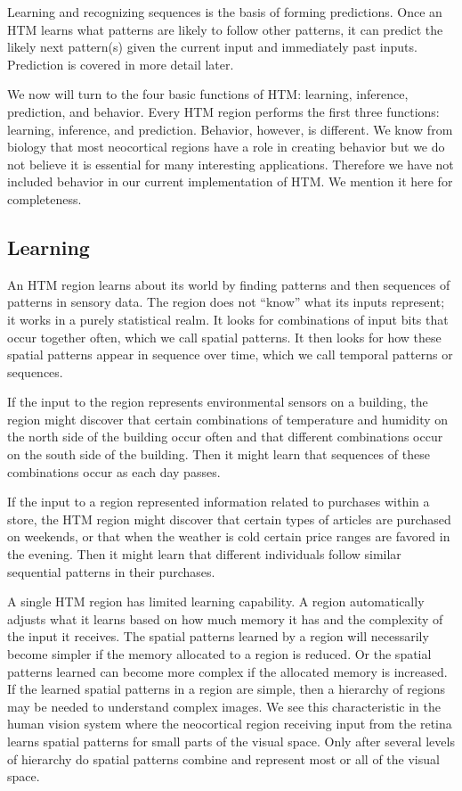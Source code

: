\documentclass{report}
\begin{document}
Learning and recognizing sequences is the basis of forming
predictions. Once an HTM learns what patterns are likely to follow
other patterns, it can predict the likely next pattern(s) given the
current input and immediately past inputs. Prediction is covered in
more detail later.

We now will turn to the four basic functions of HTM: learning,
inference, prediction, and behavior. Every HTM region performs the
first three functions: learning, inference, and prediction. Behavior,
however, is different. We know from biology that most neocortical
regions have a role in creating behavior but we do not believe it is
essential for many interesting applications. Therefore we have not
included behavior in our current implementation of HTM. We mention it
here for completeness.

\subsection*{Learning}

An HTM region learns about its world by finding patterns and then
sequences of patterns in sensory data. The region does not ``know''
what its inputs represent; it works in a purely statistical realm. It
looks for combinations of input bits that occur together often, which
we call spatial patterns. It then looks for how these spatial patterns
appear in sequence over time, which we call temporal patterns or
sequences.

If the input to the region represents environmental sensors on a
building, the region might discover that certain combinations of
temperature and humidity on the north side of the building occur often
and that different combinations occur on the south side of the
building. Then it might learn that sequences of these combinations
occur as each day passes.

If the input to a region represented information related to purchases
within a store, the HTM region might discover that certain types of
articles are purchased on weekends, or that when the weather is cold
certain price ranges are favored in the evening. Then it might learn
that different individuals follow similar sequential patterns in their
purchases.

A single HTM region has limited learning capability. A region
automatically adjusts what it learns based on how much memory it has
and the complexity of the input it receives. The spatial patterns
learned by a region will necessarily become simpler if the memory
allocated to a region is reduced. Or the spatial patterns learned can
become more complex if the allocated memory is increased. If the
learned spatial patterns in a region are simple, then a hierarchy of
regions may be needed to understand complex images. We see this
characteristic in the human vision system where the neocortical region
receiving input from the retina learns spatial patterns for small
parts of the visual space. Only after several levels of hierarchy do
spatial patterns combine and represent most or all of the visual
space.
\end{document}
